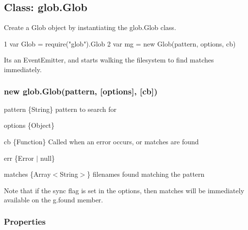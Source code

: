 \subsection*{Class\+: glob.\+Glob}

Create a Glob object by instantiating the {\ttfamily glob.\+Glob} class.


\begin{DoxyCode}
1 var Glob = require("glob").Glob
2 var mg = new Glob(pattern, options, cb)
\end{DoxyCode}


It\textquotesingle{}s an Event\+Emitter, and starts walking the filesystem to find matches immediately.

\subsubsection*{new glob.\+Glob(pattern, \mbox{[}options\mbox{]}, \mbox{[}cb\mbox{]})}


\begin{DoxyItemize}
\item {\ttfamily pattern} \{String\} pattern to search for
\item {\ttfamily options} \{Object\}
\item {\ttfamily cb} \{Function\} Called when an error occurs, or matches are found
\begin{DoxyItemize}
\item {\ttfamily err} \{Error $\vert$ null\}
\item {\ttfamily matches} \{Array$<$\+String$>$\} filenames found matching the pattern
\end{DoxyItemize}
\end{DoxyItemize}

Note that if the {\ttfamily sync} flag is set in the options, then matches will be immediately available on the {\ttfamily g.\+found} member.

\subsubsection*{Properties}


